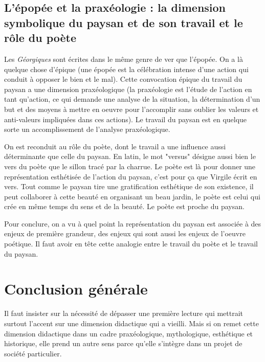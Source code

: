 \documentclass[a4paper,12pt]{book}
\begin{document}
\subsection{L'épopée et la praxéologie : la dimension symbolique du paysan et de son travail et le rôle du poète}
Les \textit{Géorgiques} sont écrites dans le même genre de ver que l'épopée. On a là quelque chose d'épique (une épopée est la célébration intense d'une action qui conduit à opposer le bien et le mal). Cette convocation épique du travail du paysan a une dimension praxéologique (la praxéologie est l'étude de l'action en tant qu'action, ce qui demande une analyse de la situation, la détermination d'un but et des moyens à mettre en oeuvre pour l'accomplir sans oublier les valeurs et anti-valeurs impliquées dans ces actions). Le travail du paysan est en quelque sorte un accomplissement de l'analyse praxéologique.
\par On est reconduit au rôle du poète, dont le travail a une influence aussi déterminante que celle du paysan. En latin, le mot "versus" désigne aussi bien le vers du poète que le sillon tracé par la charrue. Le poète est là pour donner une représentation esthétisée de l'action du paysan, c'est pour ça que Virgile écrit en vers. Tout comme le paysan tire une gratification esthétique de son existence, il peut collaborer à cette beauté en organisant un beau jardin, le poète est celui qui crée en même temps du sens et de la beauté. Le poète est proche du paysan.
\par Pour conclure, on a vu à quel point la représentation du paysan est associée à des enjeux de première grandeur, des enjeux qui sont aussi les enjeux de l'oeuvre poétique. Il faut avoir en tête cette analogie entre le travail du poète et le travail du paysan.

\section{Conclusion générale}
Il faut insister sur la nécessité de dépasser une première lecture qui mettrait surtout l'accent sur une dimension didactique qui a vieilli. Mais si on remet cette dimension didactique dans un cadre praxéologique, mythologique, esthétique et historique, elle prend un autre sens parce qu'elle s'intègre dans un projet de société particulier.
\end{document}
